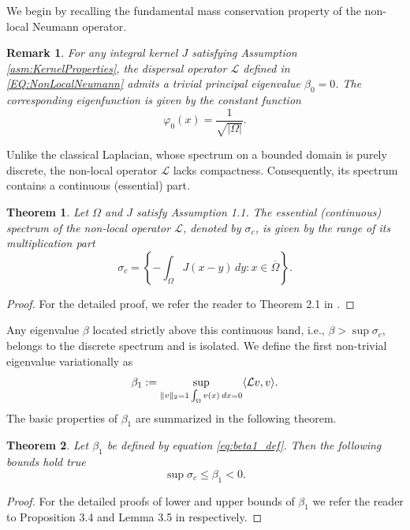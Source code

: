 \documentclass[11pt, a4paper]{article}
\theoremstyle{break}
\newtheorem{thm}{Theorem}[section]
\theoremstyle{break}
\theoremstyle{break}
\theoremstyle{break}
\newtheorem{rem}{Remark}[section]
\theoremstyle{break}
\theoremstyle{break}
\theoremstyle{break}
\theoremstyle{break}
\theoremstyle{break}
\begin{document}
We begin by recalling the fundamental mass conservation property of the non-local Neumann operator.

\begin{rem}
    For any integral kernel $J$ satisfying Assumption \ref{asm:KernelProperties}, the dispersal operator $\mathcal{L}$ defined in \eqref{EQ:NonLocalNeumann} admits a trivial principal eigenvalue $\beta_0 = 0$. The corresponding eigenfunction is given by the constant function 
    \begin{equation}
        \varphi_0(x) = \frac{1}{\sqrt{|\Omega|}}.
    \end{equation}
\end{rem}

Unlike the classical Laplacian, whose spectrum on a bounded domain is purely discrete, the non-local operator $\mathcal{L}$ lacks compactness. Consequently, its spectrum contains a continuous (essential) part.

\begin{thm}
    \label{thm:contninous_spectrum}
    Let $\Omega$ and $J$ satisfy Assumption 1.1. The essential (continuous) spectrum of the non-local operator $\mathcal{L}$, denoted by $\sigma_c$, is given by the range of its multiplication part
    \begin{equation}
        \sigma_c = \left\{ -\int_\Omega J(x-y) \,dy : x \in \overline{\Omega} \right\}.
    \end{equation}
\end{thm}
\begin{proof}
    For the detailed proof, we refer the reader to Theorem 2.1 in \cite{Tadej2025}.
\end{proof}

Any eigenvalue $\beta$ located strictly above this continuous band, i.e., $\beta > \sup \sigma_c$, belongs to the discrete spectrum and is isolated. We define the first non-trivial eigenvalue variationally as
\begin{equation}\label{eq:beta1_def}
    \beta_1 := \sup_{\|v\|_2 = 1 \\ \int_\Omega v(x) \:dx = 0} \langle \mathcal{L}v, v \rangle.
\end{equation}
The basic properties of $\beta_1$ are summarized in the following theorem.

\begin{thm}
    \label{thm:beta1_bounds}
    Let $\beta_1$ be defined by equation \eqref{eq:beta1_def}. Then the following bounds hold true
    \begin{equation}
        \sup \sigma_c \leq \beta_1 < 0.
    \end{equation}
\end{thm}
\begin{proof}
    For the detailed proofs of lower and upper bounds of $\beta_1$ we refer the reader to Proposition 3.4 and Lemma 3.5 in \cite{AndreuVaillo2010} respectively.
\end{proof}
\end{document}
